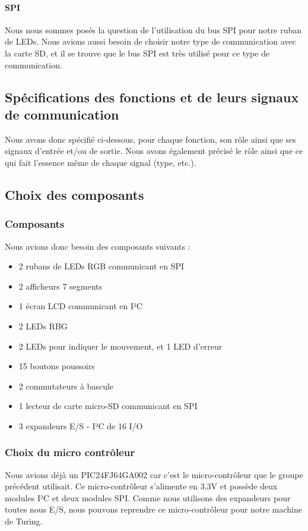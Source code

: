 \documentclass[12pt]{report}
\begin{document}
	\paragraph{SPI}
	Nous nous sommes posés la question de l'utilisation du bus SPI pour notre ruban de LEDs. Nous avions aussi besoin de choisir notre type de communication avec la carte SD, et il se trouve que le bus SPI est très utilisé pour ce type de communication.\\
	\subsection{Spécifications des fonctions et de leurs signaux de communication}
	Nous avons donc spécifié ci-dessous, pour chaque fonction, son rôle ainsi que ses signaux d'entrée et/ou de sortie. Nous avons également précisé le rôle ainsi que ce qui fait l'essence même de chaque signal (type, etc.).
	
	\subsection{Choix des composants}
	\subsubsection{Composants}
	Nous avions donc besoin des composants suivants :
	\begin{itemize}[label=$-$]
		\item 2 rubans de LEDs RGB communicant en SPI
		\item 2 afficheurs 7 segments
		\item 1 écran LCD communicant en I²C
		\item 2 LEDs RBG
		\item 2 LEDs pour indiquer le mouvement, et 1 LED d'erreur
		\item 15 boutons poussoirs
		\item 2 commutateurs à bascule
		\item 1 lecteur de carte micro-SD communicant en SPI
		\item 3 expandeurs E/S - I²C de 16 I/O
	\end{itemize}
	\subsubsection{Choix du micro contrôleur}
	Nous avions déjà un PIC24FJ64GA002 car c'est le micro-contrôleur que le groupe précédent utilisait. Ce micro-contrôleur s'alimente en 3,3V et possède deux modules I²C et deux modules SPI. Comme nous utilisons des expandeurs pour toutes nous E/S, nous pouvons reprendre ce micro-contrôleur pour notre machine de Turing.\\
\end{document}
